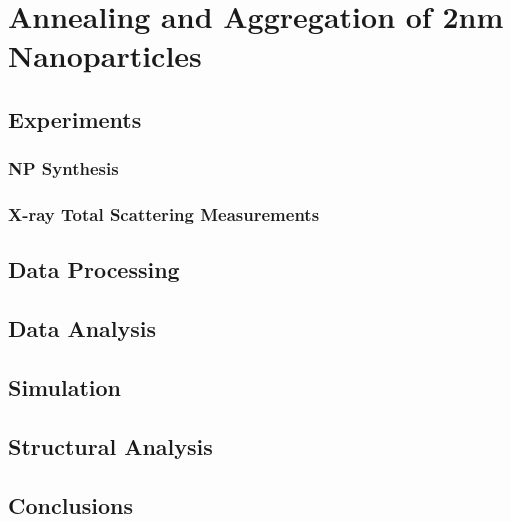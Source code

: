 \chapter{Annealing and Aggregation of 2nm \\ Nanoparticles}
\section{Experiments}
\subsection{NP Synthesis}
\subsection{X-ray Total Scattering Measurements}
\section{Data Processing}
\section{Data Analysis}
\section{Simulation}
\section{Structural Analysis}
\section{Conclusions}